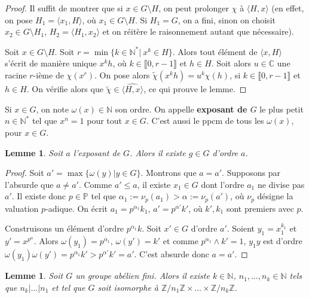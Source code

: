\documentclass[a4paper]{article}
\theoremstyle{definition} %
\theoremstyle{plain} %
\newtheorem{Lem}[Def]{Lemme} %
\theoremstyle{remark} %
\newcommand{\C}{\mathbb{C}}
\newcommand{\N}{\mathbb{N}}
\newcommand{\Z}{\mathbb{Z}}
\newcommand{\p}{\mathbb{P}}
\begin{document}
\begin{proof}
Il suffit de montrer que si $x\in G\setminus H$, on peut prolonger $\chi$ à $\langle H,x\rangle$ (en effet, on pose $H_1=\langle x_1,H\rangle$, où $x_1\in G\setminus H$. Si $H_1=G$, on a fini, sinon on choisit $x_2\in G\setminus H_1$, $H_2=\langle H_1,x_2\rangle$ et on réitère le raisonnement autant que nécessaire). 

Soit $x\in G\setminus H$. Soit $r=\min\{ k\in \N^*|\ x^k\in H\}$. Alors tout élément de $\langle x,H\rangle$ s'écrit de manière unique $x^kh$, où $k\in \llbracket 0,r-1\rrbracket$ et $h\in H$. Soit alors $u\in \C$ une racine $r$-ième de $\chi(x^r)$. On pose alors $\widetilde{\chi}(x^kh)=u^k\chi(h)$, si $k\in \llbracket 0,r-1\rrbracket$ et $h\in H$. On vérifie alors que $\widetilde{\chi}\in \widehat{\langle H,x\rangle}$, ce qui prouve le lemme. 
\end{proof}

Si $x\in G$, on note $\omega(x)\in \N$ son ordre. On appelle \textbf{exposant de $G$} le plus petit $n\in \N^*$ tel que $x^n=1$   pour tout $x\in G$. C'est aussi le ppcm de tous les $\omega(x)$, pour $x\in G$.

\begin{Lem}\label{lemDéfinition_exposant}
Soit $a$ l'exposant de $G$. Alors il existe $g\in G$ d'ordre $a$.
\end{Lem}

\begin{proof}
Soit $a'=\max\{ \omega(y)|y\in G\}$. Montrons que $a=a'$. Supposons par l'absurde que $a\neq a'$. Comme $a'\leq a$, il existe $x_1\in G$ dont l'ordre $a_1$ ne divise pas $a'$. Il existe donc $p\in \p$ tel que $\alpha_1:=\nu_p(a_1)>\alpha:=\nu_p(a')$, où $\nu_p$ désigne la valuation $p$-adique. On écrit $a_1=p^{\alpha_1}k_1$, $a'=p^{\alpha '}k'$, où $k',k_1$ sont premiers avec $p$. 

Construisons un élément d'ordre $p^{\alpha_1}k$. Soit $x'\in G$ d'ordre $a'$. Soient $y_1=x_1^{k_1}$ et $y'=x^{p^\alpha}$. Alors $\omega(y_1)=p^{\alpha_1}$, $\omega(y')=k'$ et comme $p^{\alpha_1}\wedge k'=1$, $y_1y$ est d'ordre $\omega(y_1)\omega(y')=p^{\alpha_1}k'>p^{\alpha'}k'=a'$. C'est absurde donc $a=a'$.
\end{proof}

\begin{Lem}\label{lemExistence_classification_groupes}
Soit $G$ un groupe abélien fini. Alors il existe $k\in \N$, $n_1,\ldots,n_k\in \N$ tels que $n_k|\ldots |n_1$ et tel que $G$ soit isomorphe à $\Z/{n_1\Z}\times \ldots \times \Z/{n_k\Z}$. 
\end{Lem}
\end{document}
